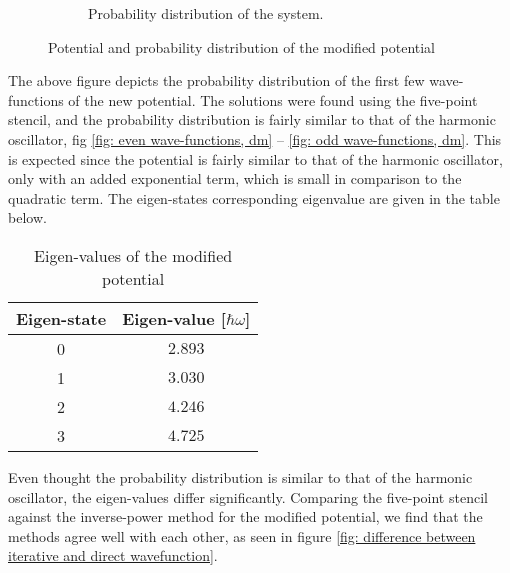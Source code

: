 \documentclass[a4paper]{article}
\newcommand{\w}{\omega}
\begin{document}
\begin{figure}[H]
\begin{subfigure}{0.45\textwidth}
        \caption{Probability distribution of the system.}
        \label{fig: potential modified probability}
    \end{subfigure}
    \caption{Potential and probability distribution of the modified potential}
    \label{fig: modified system}
\end{figure}\noindent
The above figure depicts the probability distribution of the first few wave-functions of the new potential.
The solutions were found using the five-point stencil, and the probability distribution is fairly similar to that of the harmonic oscillator, fig \ref{fig: even wave-functions, dm} -- \ref{fig: odd wave-functions, dm}.
This is expected since the potential is fairly similar to that of the harmonic oscillator, only with an added exponential term, which is small in comparison to the quadratic term.
The eigen-states corresponding eigenvalue are given in the table below.
\begin{table}[H]
    \centering
    \caption{Eigen-values of the modified potential}
    \begin{tabular}{|c|c|}\hline
        Eigen-state & Eigen-value [$\hbar\w$]\\\hline
        0 & $2.893$\\
        1 & $3.030$\\
        2 & $4.246$\\
        3 & $4.725$\\\hline
    \end{tabular}
\end{table}\noindent
Even thought the probability distribution is similar to that of the harmonic oscillator, the eigen-values differ significantly.
Comparing the five-point stencil against the inverse-power method for the modified potential, we find that the methods agree well with each other, as seen in figure \ref{fig: difference between iterative and direct wavefunction}.
\end{document}
